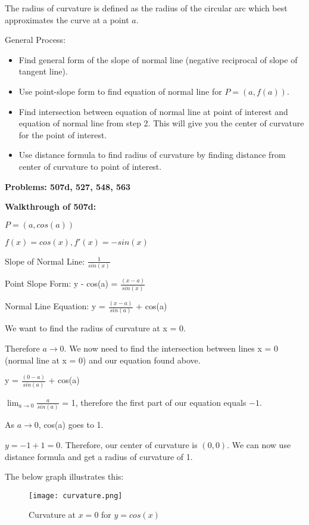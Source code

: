 \documentclass[11pt,twoside]{article}
\begin{document}
\begin{enumerate}
The radius of curvature is defined as the radius of the circular arc which best approximates the curve at a point $a$. 

General Process:
\begin{itemize}
    \item Find general form of the slope of normal line (negative reciprocal of slope of tangent line). 
    \item Use point-slope form to find equation of normal line for $P = (a, f(a))$. 
    \item Find intersection between equation of normal line at point of interest and equation of normal line from step 2. This will give you the center of curvature for the point of interest.
    \item Use distance formula to find radius of curvature by finding distance from center of curvature to point of interest. 
\end{itemize}

\textbf{Problems: 507d, 527, 548, 563}

\textbf{Walkthrough of 507d:}

$P = (a, cos(a))$

$f(x) = cos(x), f'(x) = -sin(x)$

Slope of Normal Line: \(\frac{1}{sin(x)}\)

Point Slope Form: y - cos(a) = \(\frac{(x-a)}{sin(x)}\)

Normal Line Equation: y = \(\frac{(x-a)}{sin(a)}\) + cos(a)

We want to find the radius of curvature at x = 0.

Therefore $a \rightarrow\text{0}$. We now need to find the intersection between lines x = 0 (normal line at x = 0) and our equation found above.

y = \(\frac{(0-a)}{sin(a)}\) + cos(a)

\(\lim_{a\to0} \frac{a}{sin(a)}\) = 1, therefore the first part of our equation equals $-1$. 

As $a \rightarrow\text{0}$, cos(a) goes to 1. 

$y = -1 + 1 = 0.$ Therefore, our center of curvature is $(0,0).$ We can now use distance formula and get a radius of curvature of 1. 

The below graph illustrates this:

\begin{figure}[H]
\centering
\texttt{[image: curvature.png]}
\caption{Curvature at $x = 0$ for $y = cos(x)$ }
\end{figure}



\end{enumerate}
\end{document}
